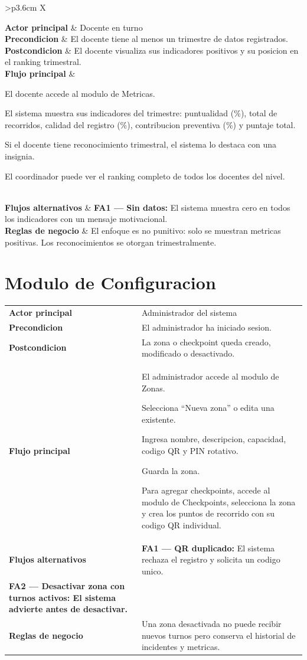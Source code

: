 \documentclass[12pt, a4paper]{article}
\newcommand{\cu}[3]{%
  \begin{tcolorbox}[casousostyle, title={#1},
    after title={\hfill\small\normalfont\color{white!80!azulOscuro}#2}]
  \renewcommand{\arraystretch}{1.35}
  \begin{tabularx}{\linewidth}{>{\bfseries\color{azulOscuro}\small}p{3.6cm} X}
  #3
  \end{tabularx}
  \end{tcolorbox}
  \vspace{6pt}
}
\newcommand{\fcu}[2]{\small\textbf{\color{azulOscuro}#1} & \small #2 \\}
\begin{document}
\cu{CU-14 --- Ver metricas de gamificacion}{Docente / Coordinador}{
  \fcu{Actor principal}{Docente en turno}
  \fcu{Precondicion}{El docente tiene al menos un trimestre de datos registrados.}
  \fcu{Postcondicion}{El docente visualiza sus indicadores positivos y su posicion en el ranking trimestral.}
  \fcu{Flujo principal}{
    \begin{pasos}
      \item El docente accede al modulo de Metricas.
      \item El sistema muestra sus indicadores del trimestre: puntualidad (\%), total de recorridos, calidad del registro (\%), contribucion preventiva (\%) y puntaje total.
      \item Si el docente tiene reconocimiento trimestral, el sistema lo destaca con una insignia.
      \item El coordinador puede ver el ranking completo de todos los docentes del nivel.
    \end{pasos}
  }
  \fcu{Flujos alternativos}{
    \textbf{FA1 --- Sin datos:} El sistema muestra cero en todos los indicadores con un mensaje motivacional.
  }
  \fcu{Reglas de negocio}{El enfoque es no punitivo: solo se muestran metricas positivas. Los reconocimientos se otorgan trimestralmente.}
}

\newpage

\section{Modulo de Configuracion}

\cu{CU-15 --- Gestionar zonas y checkpoints}{Administrador}{
  \fcu{Actor principal}{Administrador del sistema}
  \fcu{Precondicion}{El administrador ha iniciado sesion.}
  \fcu{Postcondicion}{La zona o checkpoint queda creado, modificado o desactivado.}
  \fcu{Flujo principal}{
    \begin{pasos}
      \item El administrador accede al modulo de Zonas.
      \item Selecciona ``Nueva zona'' o edita una existente.
      \item Ingresa nombre, descripcion, capacidad, codigo QR y PIN rotativo.
      \item Guarda la zona.
      \item Para agregar checkpoints, accede al modulo de Checkpoints, selecciona la zona y crea los puntos de recorrido con su codigo QR individual.
    \end{pasos}
  }
  \fcu{Flujos alternativos}{
    \textbf{FA1 --- QR duplicado:} El sistema rechaza el registro y solicita un codigo unico.\\[4pt]
    \textbf{FA2 --- Desactivar zona con turnos activos:} El sistema advierte antes de desactivar.
  }
  \fcu{Reglas de negocio}{Una zona desactivada no puede recibir nuevos turnos pero conserva el historial de incidentes y metricas.}
}
\end{document}
